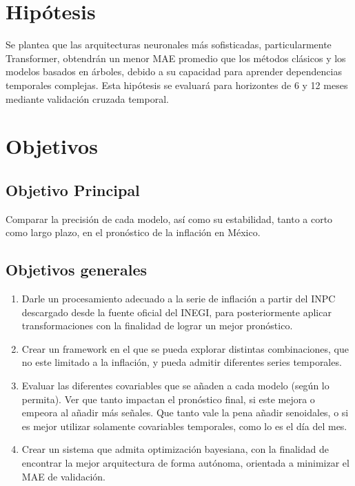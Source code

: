 \documentclass[12pt,letterpaper]{article}
\begin{document}
\section{Hipótesis}
\label{sec:hipotesis}

Se plantea que las arquitecturas neuronales más
sofisticadas, particularmente Transformer, obtendrán
un menor MAE promedio que los métodos clásicos
y los modelos basados en árboles, debido a su
capacidad para aprender dependencias temporales
complejas. Esta hipótesis se evaluará para
horizontes de 6 y 12 meses mediante validación
cruzada temporal.

\section{Objetivos}
\label{sec:objetivos}

\subsection{Objetivo Principal}
Comparar la precisión de cada modelo, así como su estabilidad, tanto a corto como largo plazo, en el pronóstico de la inflación en México.

\subsection{Objetivos generales}
\begin{enumerate}
    \item Darle un procesamiento adecuado a la serie de inflación a partir del INPC descargado desde la fuente oficial del INEGI, para posteriormente aplicar transformaciones con la finalidad de lograr un mejor pronóstico.
    \item Crear un framework en el que se pueda explorar distintas combinaciones, que no este limitado a la inflación, y pueda admitir diferentes series temporales.
    \item Evaluar las diferentes covariables que se añaden a cada modelo (según lo permita). Ver que tanto impactan el pronóstico final, si este mejora o empeora al añadir más señales. Que tanto vale la pena añadir senoidales, o si es mejor utilizar solamente covariables temporales, como lo es el día del mes.
    \item Crear un sistema que admita optimización bayesiana, con la finalidad de encontrar la mejor arquitectura de forma autónoma, orientada a minimizar el MAE de validación.
\end{enumerate}
\end{document}
